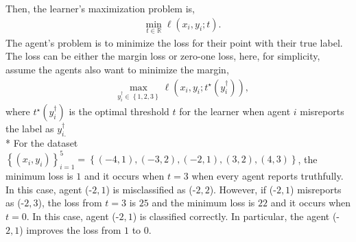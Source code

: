 \documentclass{article}
\begin{document}
Then, the learner's maximization problem is,
\begin{align*}
&\displaystyle\min_{t \in \mathbb{R}} \ell\left(x_{i}, y_{i}; t\right).
\end{align*}
The agent's problem is to minimize the loss for their point with their true label. The loss can be either the margin loss or zero-one loss, here, for simplicity, assume the agents also want to minimize the margin,
\begin{align*}
&\displaystyle\max_{y^{\dagger}_{i} \in \left\{1, 2, 3\right\}} \ell\left(x_{i}, y_{i}; t^\star \left(y^{\dagger}_{i}\right)\right),
\end{align*}
where $t^\star \left(y^{\dagger}_{i}\right)$ is the optimal threshold $t $ for the learner when agent $i $ misreports the label as $y^{\dagger}_{i.}$
\\* For the dataset $\left\{\left(x_{i}, y_{i}\right)\right\}_{i=1}^{5} = \left\{\left(-4, 1\right), \left(-3, 2\right), \left(-2, 1\right), \left(3, 2\right), \left(4, 3\right)\right\}$, the minimum loss is $1$ and it occurs when $t  = 3$ when every agent reports truthfully. In this case, agent (-$2, 1$) is misclassified as (-$2, 2$). However, if (-$2, 1$) misreports as (-$2, 3$), the loss from $t  = 3$ is $25$ and the minimum loss is $22$ and it occurs when $t  = 0$. In this case, agent (-$2, 1$) is classified correctly. In particular, the agent (-$2, 1$) improves the loss from $1$ to $0$.
\newline \newline

\begin{figure}[H] \centering {} \label{fig:1dat}
\end{figure}
\end{document}
